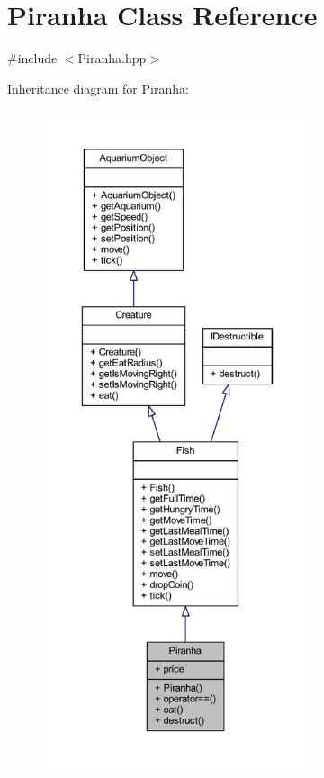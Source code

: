\hypertarget{class_piranha}{}\section{Piranha Class Reference}
\label{class_piranha}


{\ttfamily \#include $<$Piranha.\+hpp$>$}



Inheritance diagram for Piranha\+:
\nopagebreak
\begin{figure}[H]
\begin{center}
\leavevmode
\includegraphics[height=550pt]{class_piranha__inherit__graph}
\end{center}
\end{figure}


